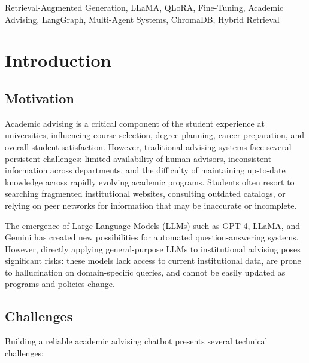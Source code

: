 \documentclass[conference,compsoc]{IEEEtran}
\begin{document}
\begin{IEEEkeywords}
Retrieval-Augmented Generation, LLaMA, QLoRA, Fine-Tuning, Academic Advising, LangGraph, Multi-Agent Systems, ChromaDB, Hybrid Retrieval
\end{IEEEkeywords}

\section{Introduction}

\subsection{Motivation}

Academic advising is a critical component of the student experience at universities, influencing course selection, degree planning, career preparation, and overall student satisfaction. However, traditional advising systems face several persistent challenges: limited availability of human advisors, inconsistent information across departments, and the difficulty of maintaining up-to-date knowledge across rapidly evolving academic programs. Students often resort to searching fragmented institutional websites, consulting outdated catalogs, or relying on peer networks for information that may be inaccurate or incomplete.

The emergence of Large Language Models (LLMs) such as GPT-4, LLaMA, and Gemini has created new possibilities for automated question-answering systems. However, directly applying general-purpose LLMs to institutional advising poses significant risks: these models lack access to current institutional data, are prone to hallucination on domain-specific queries, and cannot be easily updated as programs and policies change.

\subsection{Challenges}

Building a reliable academic advising chatbot presents several technical challenges:
\end{document}
